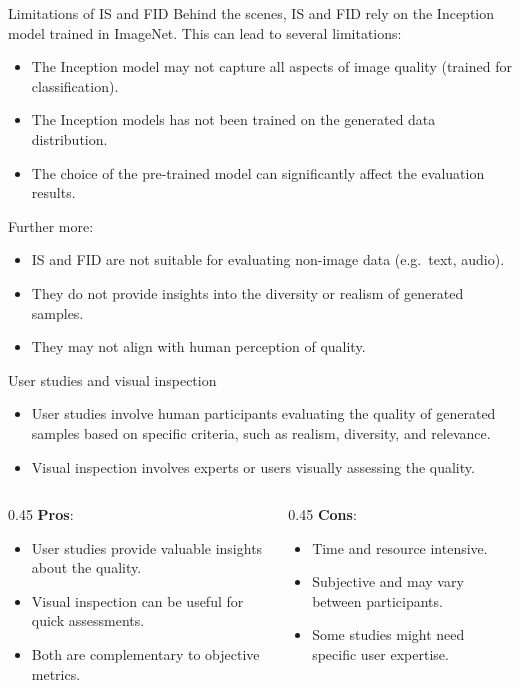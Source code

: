 \documentclass[11pt,aspectratio=169,usenames,dvipsnames]{beamer}
\begin{document}
\begin{frame}{Limitations of IS and FID}
 Behind the scenes, IS and FID rely on the Inception model trained in ImageNet. This can lead to several limitations:
  \begin{itemize}
  \item The Inception model may not capture all aspects of image quality (trained for classification).
  \item The Inception models has not been trained on the generated data distribution.
  \item The choice of the pre-trained model can significantly affect the evaluation results.
  \end{itemize}
  Further more:
  \begin{itemize}
  \item IS and FID are not suitable for evaluating non-image data (e.g.\ text, audio).
  \item They do not provide insights into the diversity or realism of generated samples.
  \item They may not align with human perception of quality.
  \end{itemize}
\end{frame}


\begin{frame}{User studies and visual inspection}
  \begin{itemize}
  \item User studies involve human participants evaluating the quality of generated samples based on specific criteria, such as realism, diversity, and relevance.
  \item Visual inspection involves experts or users visually assessing the quality.\vspace{6mm}
  \end{itemize}
  \begin{columns}
  \begin{column}{0.45\textwidth}
  \textbf{Pros}:
    \begin{itemize}
    \item User studies provide valuable insights about the quality.
    \item Visual inspection can be useful for quick assessments.
    \item Both are complementary to objective metrics.
    \end{itemize}
  \end{column}
  \begin{column}{0.45\textwidth}
   \textbf{Cons}:
    \begin{itemize}
    \item Time and resource intensive.
    \item Subjective and may vary between participants.
    \item Some studies might need specific user expertise.
    \end{itemize}
  \end{column}
  \end{columns}  
\end{frame}
\end{document}
